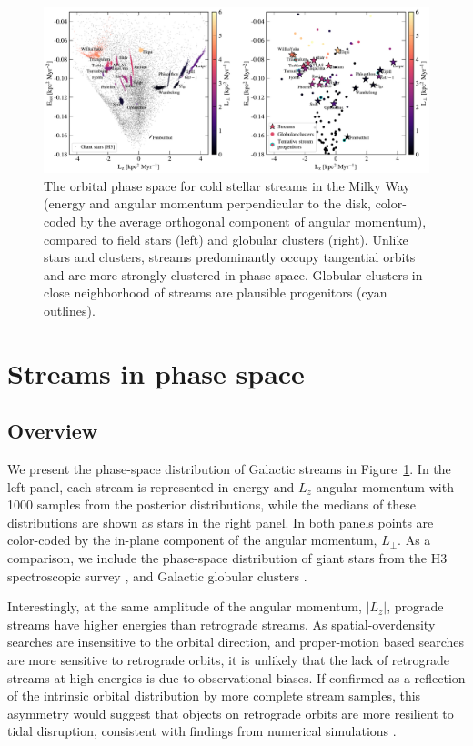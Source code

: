 \documentclass[twocolumn]{aastex63}
\begin{document}
\begin{figure}
\begin{center}
\includegraphics[width=\textwidth]{elz_streams.pdf}
\end{center}
\caption{The orbital phase space for cold stellar streams in the Milky Way (energy and angular momentum perpendicular to the disk, color-coded by the average orthogonal component of angular momentum), compared to field stars (left) and globular clusters (right).
Unlike stars and clusters, streams predominantly occupy tangential orbits and are more strongly clustered in phase space.
Globular clusters in close neighborhood of streams are plausible progenitors (cyan outlines).
}
\label{fig:elz}
\end{figure}

\section{Streams in phase space}

\subsection{Overview}
\label{sec:elz}

We present the phase-space distribution of Galactic streams in Figure~\ref{fig:elz}.
In the left panel, each stream is represented in energy and $L_z$ angular momentum with 1000 samples from the posterior distributions, while the medians of these distributions are shown as stars in the right panel.
In both panels points are color-coded by the in-plane component of the angular momentum, $L_\perp$.
As a comparison, we include the phase-space distribution of giant stars from the H3 spectroscopic survey \citep[left panel, small black points;][]{conroy2019}, and Galactic globular clusters \citep[righ panel, small circles colored by $L_\perp$;][]{baumgardt2019}.

Interestingly, at the same amplitude of the angular momentum, $|L_z|$, prograde streams have higher energies than retrograde streams.
As spatial-overdensity searches are insensitive to the orbital direction, and proper-motion based searches are more sensitive to retrograde orbits, it is unlikely that the lack of retrograde streams at high energies is due to observational biases.
If confirmed as a reflection of the intrinsic orbital distribution by more complete stream samples, this asymmetry would suggest that objects on retrograde orbits are more resilient to tidal disruption, consistent with findings from numerical simulations \citep[e.g.,][]{find}.
\end{document}
